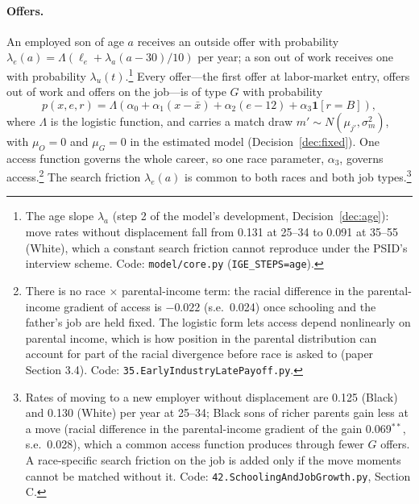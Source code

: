 \documentclass[11pt]{article}
\newcommand{\code}[1]{\texttt{#1}}
\newcommand{\1}{\mathbf{1}}
\begin{document}
\paragraph{Offers.} An employed son of age $a$ receives an outside offer with probability $\lambda_e(a) =
\Lambda(\ell_e + \lambda_a (a - 30)/10)$ per year; a son out of work receives one with probability
$\lambda_u(t)$.\footnote{The age slope $\lambda_a$ (step 2 of the model's development, Decision~\ref{dec:age}): move
rates without displacement fall from 0.131 at 25--34 to 0.091 at 35--55 (White), which a constant search friction cannot
reproduce under the PSID's interview scheme. Code: \code{model/core.py} (\code{IGE\_STEPS=age}).} Every offer---the first offer at labor-market entry, offers out of work and
offers on the job---is of type $G$ with probability
\begin{equation}\label{eq:access}
p(x, e, r) = \Lambda\left(\alpha_0 + \alpha_1 (x - \bar x) + \alpha_2 (e - 12) + \alpha_3 \1[r = B]\right),
\end{equation}
where $\Lambda$ is the logistic function, and carries a match draw $m' \sim N(\mu_{j'}, \sigma_m^2)$, with $\mu_O = 0$ and $\mu_G = 0$ in the estimated
model (Decision~\ref{dec:fixed}).
One access function governs the whole career, so one race parameter, $\alpha_3$, governs access.\footnote{There is no
race $\times$ parental-income term: the racial difference in the parental-income gradient of access is
$-0.022$ (s.e.\ 0.024) once schooling and the father's job are held fixed. The logistic form lets access depend
nonlinearly on parental income, which is how position in the parental distribution can account for part of the racial
divergence before race is asked to (paper Section 3.4). Code: \code{35.EarlyIndustryLatePayoff.py}.} The search
friction $\lambda_e(a)$ is common to both races and both job types.\footnote{Rates of moving to a new employer without
displacement are 0.125 (Black) and 0.130 (White) per year at 25--34; Black sons of richer parents gain less at a move
(racial difference in the parental-income gradient of the gain 0.069$^{**}$, s.e.\ 0.028), which a common access
function produces through fewer $G$ offers. A race-specific search friction on the job \citep[as in][]{bowlus2002discrimination}
is added only if the move moments cannot be matched without it. Code: \code{42.SchoolingAndJobGrowth.py}, Section C.}
\end{document}
